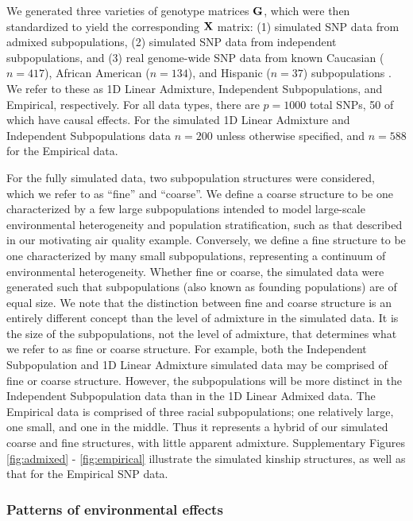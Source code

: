 We generated three varieties of genotype matrices $\mathbf{G}$, which were then standardized to yield the corresponding $\mathbf{X}$ matrix: (1) simulated SNP data from admixed subpopulations, (2) simulated SNP data from independent subpopulations, and (3) real genome-wide SNP data from known Caucasian ($n = 417$), African American ($n = 134$), and Hispanic ($n = 37$) subpopulations \citep{larkin2015objectives}. We refer to these as 1D Linear Admixture, Independent Subpopulations, and Empirical, respectively. For all data types, there are $p = 1000$ total SNPs, 50 of which have causal effects. For the simulated 1D Linear Admixture and Independent Subpopulations data $n = 200$ unless otherwise specified, and $n = 588$ for the Empirical data. 

For the fully simulated data, two subpopulation structures were considered, which we refer to as ``fine'' and ``coarse''.  We define a coarse structure to be one characterized by a few large subpopulations intended to model large-scale environmental heterogeneity and population stratification, such as that described in our motivating air quality example. Conversely, we define a fine structure to be one characterized by many small subpopulations, representing a continuum of environmental heterogeneity. Whether fine or coarse, the simulated data were generated such that subpopulations (also known as founding populations) are of equal size. We note that the distinction between fine and coarse structure is an entirely different concept than the level of admixture in the simulated data. It is the size of the subpopulations, not the level of admixture, that determines what we refer to as fine or coarse structure. For example, both the Independent Subpopulation and 1D Linear Admixture simulated data may be comprised of fine or coarse structure. However, the subpopulations will be more distinct in the Independent Subpopulation data than in the 1D Linear Admixed data. The Empirical data is comprised of three racial subpopulations; one relatively large, one small, and one in the middle. Thus it represents a hybrid of our simulated coarse and fine structures, with little apparent admixture. Supplementary Figures \ref{fig:admixed} - \ref{fig:empirical} illustrate the simulated kinship structures, as well as that for the Empirical SNP data. 

\subsubsection{Patterns of environmental effects}

